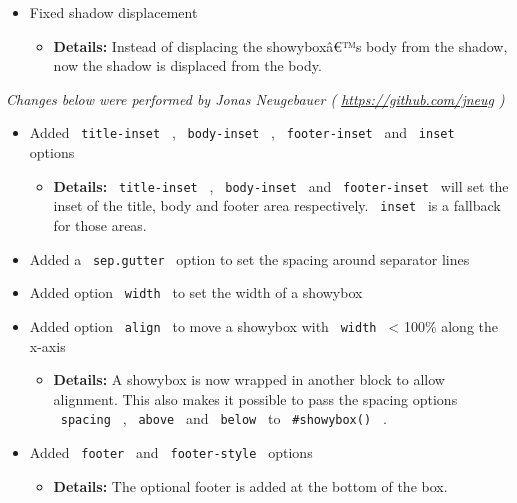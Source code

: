 \begin{itemize}
\tightlist
\item
  Fixed shadow displacement

  \begin{itemize}
  \tightlist
  \item
    \textbf{Details:} Instead of displacing the showyboxâ€™s body from
    the shadow, now the shadow is displaced from the body.
  \end{itemize}
\end{itemize}

\emph{Changes below were performed by Jonas Neugebauer (
\url{https://github.com/jneug} )}

\begin{itemize}
\tightlist
\item
  Added \texttt{\ title-inset\ } , \texttt{\ body-inset\ } ,
  \texttt{\ footer-inset\ } and \texttt{\ inset\ } options

  \begin{itemize}
  \tightlist
  \item
    \textbf{Details:} \texttt{\ title-inset\ } , \texttt{\ body-inset\ }
    and \texttt{\ footer-inset\ } will set the inset of the title, body
    and footer area respectively. \texttt{\ inset\ } is a fallback for
    those areas.
  \end{itemize}
\item
  Added a \texttt{\ sep.gutter\ } option to set the spacing around
  separator lines
\item
  Added option \texttt{\ width\ } to set the width of a showybox
\item
  Added option \texttt{\ align\ } to move a showybox with
  \texttt{\ width\ } \textless{} 100\% along the x-axis

  \begin{itemize}
  \tightlist
  \item
    \textbf{Details:} A showybox is now wrapped in another block to
    allow alignment. This also makes it possible to pass the spacing
    options \texttt{\ spacing\ } , \texttt{\ above\ } and
    \texttt{\ below\ } to \texttt{\ \#showybox()\ } .
  \end{itemize}
\item
  Added \texttt{\ footer\ } and \texttt{\ footer-style\ } options

  \begin{itemize}
  \tightlist
  \item
    \textbf{Details:} The optional footer is added at the bottom of the
    box.
  \end{itemize}
\end{itemize}

